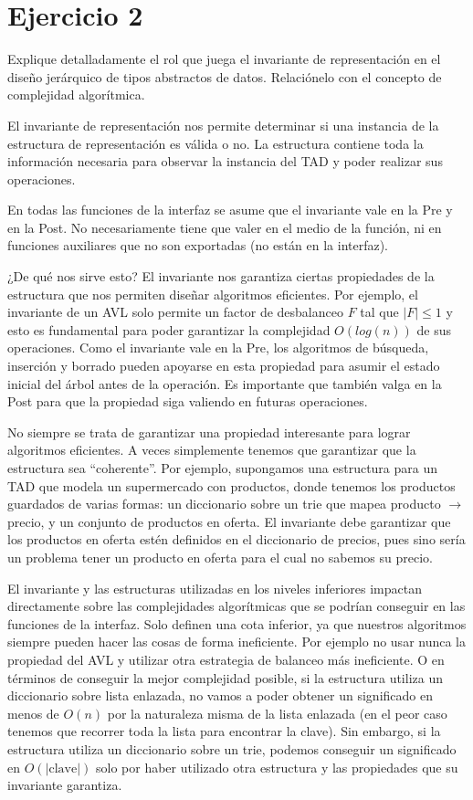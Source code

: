 \section*{Ejercicio 2}

Explique detalladamente el rol que juega el invariante de representación en el diseño jerárquico de tipos abstractos de datos. Relaciónelo con el concepto de complejidad algorítmica.

El invariante de representación nos permite determinar si una instancia de la estructura de representación es válida o no. La estructura contiene toda la información necesaria para observar la instancia del TAD y poder realizar sus operaciones.

En todas las funciones de la interfaz se asume que el invariante vale en la Pre y en la Post. No necesariamente tiene que valer en el medio de la función, ni en funciones auxiliares que no son exportadas (no están en la interfaz).

¿De qué nos sirve esto? El invariante nos garantiza ciertas propiedades de la estructura que nos permiten diseñar algoritmos eficientes. Por ejemplo, el invariante de un AVL solo permite un factor de desbalanceo $F$ tal que $|F| \leq 1$ y esto es fundamental para poder garantizar la complejidad $O(log(n))$ de sus operaciones. Como el invariante vale en la Pre, los algoritmos de búsqueda, inserción y borrado pueden apoyarse en esta propiedad para asumir el estado inicial del árbol antes de la operación. Es importante que también valga en la Post para que la propiedad siga valiendo en futuras operaciones.

No siempre se trata de garantizar una propiedad interesante para lograr algoritmos eficientes. A veces simplemente tenemos que garantizar que la estructura sea ``coherente''. Por ejemplo, supongamos una estructura para un TAD que modela un supermercado con productos, donde tenemos los productos guardados de varias formas: un diccionario sobre un trie que mapea producto $\to$ precio, y un conjunto de productos en oferta. El invariante debe garantizar que los productos en oferta estén definidos en el diccionario de precios, pues sino sería un problema tener un producto en oferta para el cual no sabemos su precio.

El invariante y las estructuras utilizadas en los niveles inferiores impactan directamente sobre las complejidades algorítmicas que se podrían conseguir en las funciones de la interfaz. Solo definen una cota inferior, ya que nuestros algoritmos siempre pueden hacer las cosas de forma ineficiente. Por ejemplo no usar nunca la propiedad del AVL y utilizar otra estrategia de balanceo más ineficiente. O en términos de conseguir la mejor complejidad posible, si la estructura utiliza un diccionario sobre lista enlazada, no vamos a poder obtener un significado en menos de $O(n)$ por la naturaleza misma de la lista enlazada (en el peor caso tenemos que recorrer toda la lista para encontrar la clave). Sin embargo, si la estructura utiliza un diccionario sobre un trie, podemos conseguir un significado en $O(|\text{clave}|)$ solo por haber utilizado otra estructura y las propiedades que su invariante garantiza.

